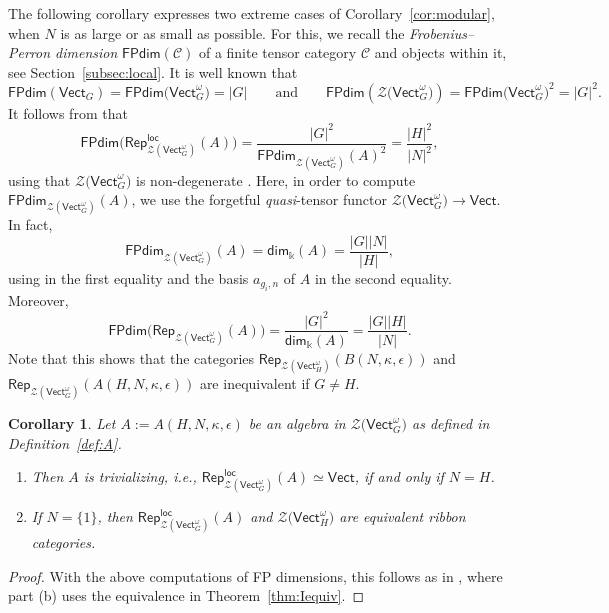\documentclass[pdftex]{sigma}
\numberwithin{equation}{section}
\newtheorem{Corollary}[Theorem]{Corollary}
\newcommand{\FPdim}{\mathsf{FPdim}}
\renewcommand{\dim}{\mathsf{dim}}
\newcommand{\Rep}{\mathsf{Rep}}
\newcommand{\locmod}{\mathsf{Rep}^{\mathsf{loc}}}
\newcommand{\Vect}{\mathsf{Vect}}
\newcommand{\cC}{\mathcal{C}}
\newcommand{\cZ}{\mathcal{Z}}
\begin{document}
The following corollary expresses two extreme cases of Corollary~\ref{cor:modular}, when $N$ is as large or as small as possible. For this, we recall the \emph{Frobenius--Perron dimension} $\FPdim(\cC)$ of a finite tensor category $\cC$ \cite[Section~4.5]{EGNO} and objects within it, see Section~\ref{subsec:local}. It is well known that
\[\FPdim(\Vect_G)=\FPdim\big(\Vect_G^\omega\big)=|G| \qquad \text{and} \qquad \FPdim(\cZ\big(\Vect_G^\omega\big))=\FPdim\big(\Vect_G^\omega\big)^2=|G|^2.\]
It follows from \cite[Corollary 4.21]{LW3} that
\[\FPdim \big(\locmod_{\cZ(\Vect_G^\omega)}(A)\big)=\frac{|G|^2}{\FPdim_{\cZ(\Vect_G^\omega)}(A)^2}= \frac{|H|^2}{|N|^2},\]
using that $\cZ\big(\Vect_G^\omega\big)$ is non-degenerate \cite[Proposition~8.6.3]{EGNO}. Here, in order to compute $\FPdim_{\cZ(\Vect_G^\omega)}(A)$, we use the forgetful \emph{quasi}-tensor functor $\cZ\big(\Vect_G^\omega\big)\to \Vect$. In fact, \[\FPdim_{\cZ(\Vect_G^\omega)}(A)=\dim_\Bbbk (A)=\frac{|G||N|}{|H|},\]
using \cite[Proposition~4.5.7]{EGNO} in the first equality and the basis $a_{g_i,n}$ of $A$ in the second equality.
Moreover,
\[\FPdim \big(\Rep_{\cZ(\Vect_G^\omega)}(A)\big)=\frac{|G|^2}{\dim_\Bbbk(A)}=\frac{|G||H|}{|N|}.\]
Note that this shows that the categories
$\Rep_{\cZ(\Vect^\omega_H)}(B(N,\kappa,\epsilon))$ and $\Rep_{\cZ(\Vect^\omega_G)}(A(H,N,\kappa,\epsilon))$ are inequivalent if $G\neq H$.

\begin{Corollary} %
Let $A:=A(H,N,\kappa,\epsilon)$ be an algebra in $\cZ\big(\Vect_G^\omega\big)$ as defined in Definition~{\rm \ref{def:A}}.
\begin{enumerate}\itemsep=0pt
\item[$(a)$] Then $A$ is \emph{trivializing}, i.e., $\locmod_{\cZ(\Vect_{G}^\omega)}(A)\simeq \Vect$, if and only if $N=H$.
\item[$(b)$] If $N=\{1\}$, then $\locmod_{\cZ(\Vect_G^\omega)}(A)$ and $\cZ\big(\Vect_H^\omega\big)$ are equivalent ribbon categories.
\end{enumerate}
\end{Corollary}
\begin{proof}
With the above computations of FP dimensions, this follows as in \cite[Corollary~6.18]{LW3}, where part (b) uses the equivalence in Theorem~\ref{thm:Iequiv}.
\end{proof}
\end{document}
